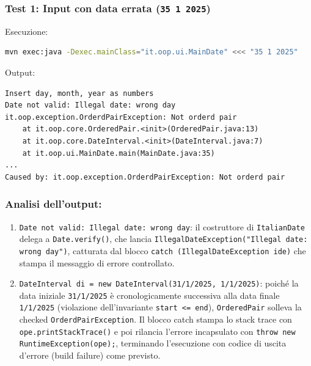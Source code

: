 \documentclass[11pt,a4paper]{article}
\newcommand{\passthrough}[1]{#1}
\providecommand{\tightlist}{\setlength{\itemsep}{0pt}\setlength{\parskip}{0pt}}
\begin{document}
\subsubsection{\texorpdfstring{Test 1: Input con data errata
(\texttt{35\ 1\ 2025})}{Test 1: Input con data errata (35 1 2025)}}\label{test-1-input-con-data-errata-35-1-2025}

Esecuzione:

\begin{lstlisting}[language=bash]
mvn exec:java -Dexec.mainClass="it.oop.ui.MainDate" <<< "35 1 2025"
\end{lstlisting}

Output:

\begin{lstlisting}
Insert day, month, year as numbers
Date not valid: Illegal date: wrong day
it.oop.exception.OrderdPairException: Not orderd pair
    at it.oop.core.OrderedPair.<init>(OrderedPair.java:13)
    at it.oop.core.DateInterval.<init>(DateInterval.java:7)
    at it.oop.ui.MainDate.main(MainDate.java:35)
...
Caused by: it.oop.exception.OrderdPairException: Not orderd pair
\end{lstlisting}

\subsubsection{Analisi dell'output:}\label{analisi-delloutput}

\begin{enumerate}
\def\labelenumi{\arabic{enumi}.}
\tightlist
\item
  \passthrough{\lstinline!Date not valid: Illegal date: wrong day!}: il
  costruttore di \passthrough{\lstinline!ItalianDate!} delega a
  \passthrough{\lstinline!Date.verify()!}, che lancia
  \passthrough{\lstinline!IllegalDateException("Illegal date: wrong day")!},
  catturata dal blocco
  \passthrough{\lstinline!catch (IllegalDateException ide)!} che stampa
  il messaggio di errore controllato.
\item
  \passthrough{\lstinline!DateInterval di = new DateInterval(31/1/2025, 1/1/2025)!}:
  poiché la data iniziale \passthrough{\lstinline!31/1/2025!} è
  cronologicamente successiva alla data finale
  \passthrough{\lstinline!1/1/2025!} (violazione dell'invariante
  \passthrough{\lstinline!start <= end!}),
  \passthrough{\lstinline!OrderedPair!} solleva la checked
  \passthrough{\lstinline!OrderdPairException!}. Il blocco catch stampa
  lo stack trace con \passthrough{\lstinline!ope.printStackTrace()!} e
  poi rilancia l'errore incapsulato con
  \passthrough{\lstinline!throw new RuntimeException(ope);!}, terminando
  l'esecuzione con codice di uscita d'errore (build failure) come
  previsto.
\end{enumerate}
\end{document}
